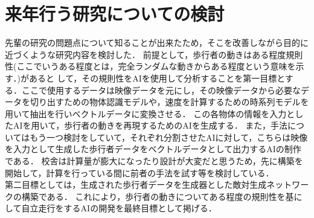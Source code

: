 \documentclass[a4paper,11pt]{ltjsarticle}
\begin{document}
\section{来年行う研究についての検討}
先輩の研究の問題点について知ることが出来たため，そこを改善しながら目的に近づくような研究内容を検討した．
前提として，歩行者の動きはある程度規則性(ここでいうある程度とは，完全ランダムな動きからある程度という意味を示す．)があると
して，その規則性をAIを使用して分析することを第一目標とする．ここで使用するデータは映像データを元にし，その映像データから必要なデータを切り出すための物体認識モデルや，速度を計算するための時系列モデルを用いて抽出を行いベクトルデータに変換させる．
この各物体の情報を入力としたAIを用いて，歩行者の動きを再現するためのAIを生成する．
また，手法についてはもう一つ検討をしていて，それぞれ分割させたAIに対して，こちらは映像を入力として生成した歩行者データをベクトルデータとして出力するAIの制作である．
校舎は計算量が膨大になったり設計が大変だと思うため，先に構築を開始して，計算を行っている間に前者の手法を試す等を検討している．\\
第二目標としては，生成された歩行者データを生成器とした敵対生成ネットワークの構築である．
これにより，歩行者の動きについてある程度の規則性を基にして自立走行をするAIの開発を最終目標として掲げる．
\end{document}
